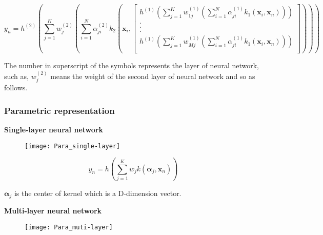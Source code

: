\documentclass{article}
\begin{document}
\begin{equation}
y_n = h^{(2)} \left( \sum\limits_{j=1}^{K} w_{j}^{(2)} \left( \sum\limits_{i=1}^{N} \alpha_{ji}^{(2)} k_2( \mathbf{x}_{i},\left[               
  \begin{array}{c}   
    h^{(1)} \left( \sum\limits_{j=1}^{K} w_{1j}^{(1)} \left( \sum\limits_{i=1}^{N} \alpha_{ji}^{(1)}k_1( \mathbf{x}_{i},\mathbf{x}_n) \right) \right)\\  
    .\\  
    .\\  
    .\\
    h^{(1)} \left( \sum\limits_{j=1}^{K} w_{Mj}^{(1)} \left( \sum\limits_{i=1}^{N} \alpha_{ji}^{(1)}k_1( \mathbf{x}_{i},\mathbf{x}_n) \right) \right)\\
  \end{array}
\right] )
 \right) \right)
\end{equation} 

\par The number in superscript of the symbols represents the layer of neural network, such as, $w_j^{(2)}$ means the weight of the second layer of neural network and so as follows. \\



\subsubsection{Parametric representation}


\par \textbf{Single-layer neural network}\\

\begin{figure}[h]
\centering
\texttt{[image: Para\_single-layer]}
\end{figure}

\begin{equation}
y_n = h \left( \sum\limits_{j=1}^K w_j k( \bm{\alpha}_j, \mathbf{x}_{n}) \right)
\end{equation}
\par $\bm{\alpha}_j$ is the center of kernel which is a D-dimension vector.\\





\par \textbf{Multi-layer neural network}\\

\begin{figure}[h]
\centering
\texttt{[image: Para\_muti-layer]}
\end{figure}
\end{document}
